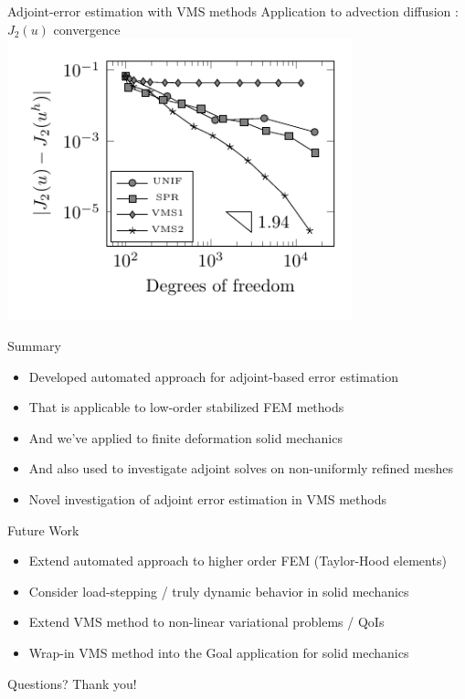 \documentclass[fleqn]{beamer}
\begin{document}
\begin{frame}{Adjoint-error estimation with VMS methods}
{Application to advection diffusion : $J_2(u)$ convergence}
\includegraphics[width=0.75\textwidth]{../img/vms_lshape_square_convergence}
\end{frame}


\begin{frame}{Summary}
\begin{itemize}
\item Developed automated approach for adjoint-based error estimation
\item That is applicable to low-order stabilized FEM methods
\item And we've applied to finite deformation solid mechanics
\item And also used to investigate adjoint solves on non-uniformly refined meshes
\item Novel investigation of adjoint error estimation in VMS methods
\end{itemize}
\end{frame}


\begin{frame}{Future Work}
\begin{itemize}
\item Extend automated approach to higher order FEM (Taylor-Hood elements)
\item Consider load-stepping / truly dynamic behavior in solid mechanics
\item Extend VMS method to non-linear variational problems / QoIs
\item Wrap-in VMS method into the Goal application for solid mechanics
\end{itemize}
\end{frame}


\begin{frame}
\centering
Questions?
Thank you!
\end{frame}
\end{document}
